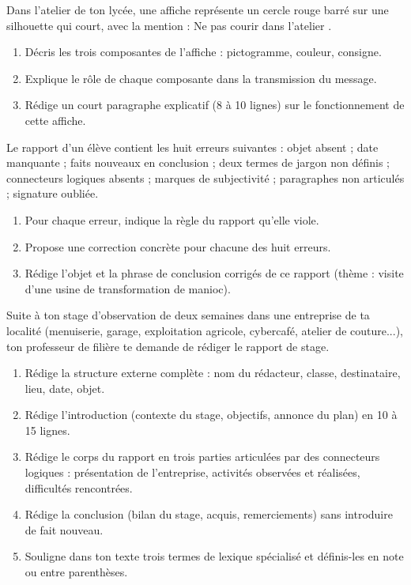 \documentclass[11pt]{article}
\newcounter{popsec}
\newcounter{popsub}
\newcommand{\courssub}[1]{%
  \stepcounter{popsub}%
  \par\vspace{9pt}\noindent{\popxbold\fontsize{11.5}{13}\selectfont\color{popink}{\color{poporange}\thepopsec.\thepopsub}\hspace{6pt}#1}\par\nopagebreak\vspace{4pt}
}
\begin{document}
\begin{exercice}
Dans l'atelier de ton lycée, une affiche représente un cercle rouge barré sur une silhouette qui court, avec la mention : \og Ne pas courir dans l'atelier \fg.
\begin{enumerate}
\item Décris les trois composantes de l'affiche : pictogramme, couleur, consigne.
\item Explique le rôle de chaque composante dans la transmission du message.
\item Rédige un court paragraphe explicatif (8 à 10 lignes) sur le fonctionnement de cette affiche.
\end{enumerate}
\end{exercice}

\begin{exercice}
Le rapport d'un élève contient les huit erreurs suivantes : objet absent ; date manquante ; faits nouveaux en conclusion ; deux termes de jargon non définis ; connecteurs logiques absents ; marques de subjectivité ; paragraphes non articulés ; signature oubliée.
\begin{enumerate}
\item Pour chaque erreur, indique la règle du rapport qu'elle viole.
\item Propose une correction concrète pour chacune des huit erreurs.
\item Rédige l'objet et la phrase de conclusion corrigés de ce rapport (thème : visite d'une usine de transformation de manioc).
\end{enumerate}
\end{exercice}

\courssub{Je me prépare au Bac}

\begin{exercice}
Suite à ton stage d'observation de deux semaines dans une entreprise de ta localité (menuiserie, garage, exploitation agricole, cybercafé, atelier de couture...), ton professeur de filière te demande de rédiger le rapport de stage.
\begin{enumerate}
\item Rédige la structure externe complète : nom du rédacteur, classe, destinataire, lieu, date, objet.
\item Rédige l'introduction (contexte du stage, objectifs, annonce du plan) en 10 à 15 lignes.
\item Rédige le corps du rapport en trois parties articulées par des connecteurs logiques : présentation de l'entreprise, activités observées et réalisées, difficultés rencontrées.
\item Rédige la conclusion (bilan du stage, acquis, remerciements) sans introduire de fait nouveau.
\item Souligne dans ton texte trois termes de lexique spécialisé et définis-les en note ou entre parenthèses.
\end{enumerate}
\end{exercice}
\end{document}
